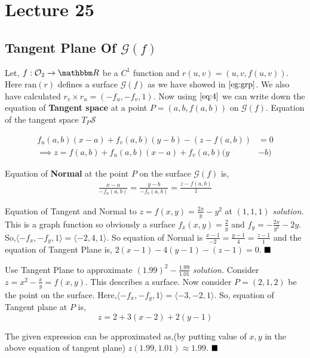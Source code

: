 \documentclass[../Analysis-3]{subfiles}
\begin{document}
\chapter*{Lecture 25} %
\setcounter{chapter}{25} %
\setcounter{section}{0}
\section{Tangent Plane Of $\mathcal{G}(f)$}

Let, $f : \mathcal{O}_2 \to \R$ be a $C^1$ function and $r(u,v) = (u,v,f(u,v))$. Here $\text{ran}(r)$ defines a surface $\mathcal{G}(f)$ as we have showed in $\ref{eg:grp}$. We also have calculated $r_v\times r_u = (-f_u,-f_v,1)$. Now using $\ref{eq:4}$ we can write down the equation of \textbf{Tangent space} at a point $P = (a,b,f(a,b))$ on $\mathcal{G}(f)$. Equation of the tangent space $T_P \mathcal{S}$

\begin{align}\label{eq:tp}
    f_u(a,b)(x-a) + f_v(a,b)(y-b)-(z-f(a,b))         & = 0 \\
    \implies z = f(a,b) + f_u(a,b)(x-a) + f_v(a,b)(y & -b)
\end{align}

Equation of \textbf{Normal} at the point $P$ on the surface $\mathcal{G}(f)$ is,
\begin{align}\label{eq:np}
    \frac{x-a}{-f_u(a,b)} = \frac{y-b}{-f_v(a,b)} = \frac{z-f(a,b)}{1}
\end{align}

\begin{Eg}{Equation of Tangent and Normal to $z = f(x,y) = \frac{2x}{y}-y^2$ at $(1,1,1)$}{}
    \textit{solution.} This is a graph function so obviously a surface $f_x(x,y) = \frac{2}{y}$ and $f_y = -\frac{2x}{y^2} -2y$. So,$\langle -f_x,- f_y,1 \rangle = \langle -2,4,1\rangle$. So equation of Normal
    is $\frac{x-1}{-2}=\frac{y-1}{4}=\frac{z-1}{1}$ and the equation of Tangent Plane is,
    $ 2(x-1)-4(y-1) -(z-1) = 0$. $\hfill \blacksquare $
\end{Eg}
\begin{Eg}{Use Tangent Plane to approximate $(1.99)^2 - \frac{1.99}{1.01}$}{}
    \textit{solution.} Consider $z = x^2 - \frac{x}{y} = f(x,y)$. This describes a surface. Now consider $P=(2,1,2)$ be the point on the surface. Here,$\langle -f_x,- f_y,1 \rangle = \langle -3,-2,1\rangle$. So, equation of Tangent plane at $P$ is, \[z = 2 +3(x-2) +2(y-1)\]

    The given expression can be approximated as,(by putting value of $x,y$ in the above equation of tangent plane) $z(1.99,1.01) \approx 1.99$. $\hfill \blacksquare$
\end{Eg}
\end{document}
